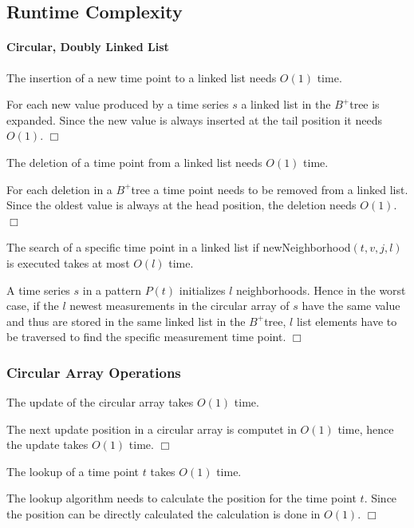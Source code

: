 \documentclass[abstracton,12pt]{scrreprt}
\newenvironment{proof}
  {\noindent{\bf Proof:\rm}}{\hfill$\Box$\vspace{\medskipamount}}
\begin{document}
\subsection{Runtime Complexity}

\paragraph{Circular, Doubly Linked List}
\begin{mydef}
	The insertion of a new time point to a linked list needs $O(1)$ time.
\end{mydef}
\begin{proof}
	For each new value produced by a time series $s$ a linked list in the $B^+$tree is expanded. Since the new value is always inserted at the tail position it needs $O(1)$.
\end{proof}
\begin{mydef}
	The deletion of a time point from a linked list needs $O(1)$ time.
\end{mydef}
\begin{proof}
	For each deletion in a $B^+$tree a time point needs to be removed from a linked list. Since the oldest value is always at the head position, the deletion needs $O(1)$.
\end{proof}
\begin{mydef}
	The search of a specific time point in a linked list if newNeighborhood$(t,v,j,l)$ is executed takes at most $O(l)$ time.
\end{mydef}
\begin{proof}
	A time series $s$ in a pattern $P(t)$ initializes $l$ neighborhoods. Hence in the worst case, if the $l$ newest measurements in the circular array of $s$ have the same value and thus are stored in the same linked list in the $B^+$tree, $l$ list elements have to be traversed to find the specific measurement time point. 
\end{proof}

\subsubsection{Circular Array Operations}
\begin{mydef}
	The update of the circular array takes $O(1)$ time.
\end{mydef}
\begin{proof}
	The next update position in a circular array is computet in $O(1)$ time, hence the update takes $O(1)$ time. 
\end{proof}
\begin{mydef}
	The lookup of a time point $t$ takes $O(1)$ time.
\end{mydef}
\begin{proof}
	The lookup algorithm needs to calculate the position for the time point $t$. Since the position can be directly calculated the calculation is done in $O(1)$.
\end{proof}
\end{document}
